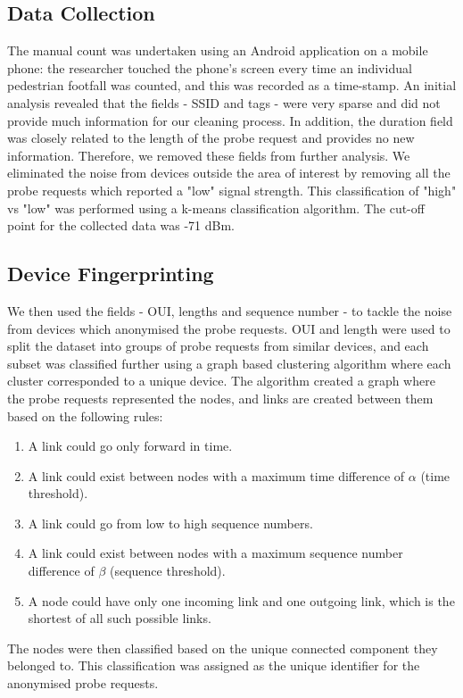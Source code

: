 \subsection{Data Collection}
The manual count was undertaken using an Android application on a mobile phone: the researcher touched the phone’s screen every time an individual pedestrian footfall was counted, and this was recorded as a time-stamp.
An initial analysis revealed that the fields - SSID and tags - were very sparse and did not provide much information for our cleaning process.
In addition, the duration field was closely related to the length of the probe request and provides no new information.
Therefore, we removed these fields from further analysis.
We eliminated the noise from devices outside the area of interest by removing all the probe requests which reported a "low" signal strength.
This classification of "high" vs "low" was performed using a k-means classification algorithm.
The cut-off point for the collected data was -71 dBm.

\subsection{Device Fingerprinting}
We then used the fields - OUI, lengths and sequence number - to tackle the noise from devices which anonymised the probe requests.
OUI and length were used to split the dataset into groups of probe requests from similar devices, and each subset was classified further using a graph based clustering algorithm where each cluster corresponded to a unique device.
The algorithm created a graph where the probe requests represented the nodes, and links are created between them based on the following rules: 
	\begin{enumerate}
		\item A link could go only forward in time. 
		\item A link could exist between nodes with a maximum time difference of $\alpha$ (time threshold).
		\item A link could go from low to high sequence numbers.
		\item A link could exist between nodes with a maximum sequence number difference of $\beta$ (sequence threshold).
		\item A node could have only one incoming link and one outgoing link, which is the shortest of all such possible links.
	\end{enumerate}
The nodes were then classified based on the unique connected component they belonged to.
This classification was assigned as the unique identifier for the anonymised probe requests.
